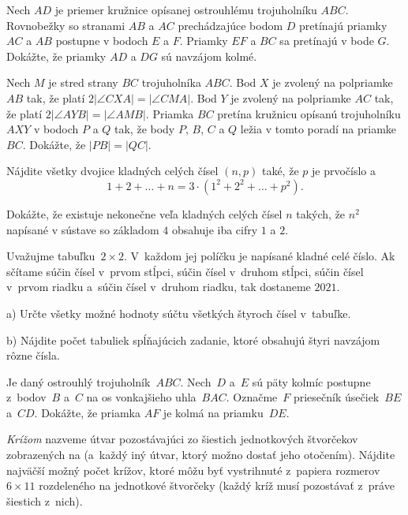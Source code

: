 {%
Nech $AD$ je priemer kružnice opísanej ostrouhlému trojuholníku $ABC$. Rovnobežky so stranami $AB$ a $AC$ prechádzajúce bodom $D$ pretínajú priamky $AC$ a $AB$ postupne v bodoch $E$ a $F$. Priamky $EF$ a $BC$ sa pretínajú v bode $G$. Dokážte, že priamky $AD$ a $DG$ sú navzájom kolmé.}

{%
Nech $M$ je stred strany $BC$ trojuholníka $ABC$. Bod $X$ je zvolený na polpriamke $AB$ tak, že platí $2|\angle CXA|=|\angle CMA|$. Bod $Y$ je zvolený na polpriamke $AC$ tak, že platí $2|\angle AYB|=|\angle AMB|$. Priamka $BC$ pretína kružnicu opísanú trojuholníku $AXY$ v bodoch $P$ a $Q$ tak, že body $P$, $B$, $C$ a $Q$ ležia v tomto poradí na priamke $BC$. Dokážte, že $|PB|=|QC|$.}

{%
Nájdite všetky dvojice kladných celých čísel $(n,p)$ také, že $p$ je prvočíslo a
$$
1+2+\dots + n  = 3\cdot (1^2 + 2^2 + \dots+ p^2).
$$}

{%
Dokážte, že existuje nekonečne veľa kladných celých čísel $n$ takých, že $n^2$ napísané v sústave so základom $4$ obsahuje iba cifry $1$ a $2$.}

{%
Uvažujme tabuľku~$2 \times 2$. V~každom jej políčku je napísané kladné celé číslo. Ak sčítame súčin čísel v~prvom stĺpci, súčin čísel v~druhom stĺpci, súčin čísel v~prvom riadku a~súčin čísel v~druhom riadku, tak dostaneme $2021$.
\item{a)} Určte všetky možné hodnoty súčtu všetkých štyroch čísel v~tabuľke.
\item{b)} Nájdite počet tabuliek spĺňajúcich zadanie, ktoré obsahujú štyri navzájom rôzne čísla.\endgraf
}

{%
Je daný ostrouhlý trojuholník~$ABC$. Nech~$D$ a~$E$ sú päty kolmíc postupne z~bodov~$B$ a~$C$ na os vonkajšieho uhla~$BAC$. Označme~$F$ priesečník úsečiek~$BE$ a~$CD$. Dokážte, že priamka $AF$ je kolmá na priamku~$DE$.}

{%
{\it Krížom\/} nazveme útvar pozostávajúci zo šiestich jednotkových štvorčekov zobrazených na \obr{} (a~každý iný útvar, ktorý možno dostať jeho otočením).
%
Nájdite najväčší možný počet krížov, ktoré môžu byť vystrihnuté z~papiera rozmerov~$6 \times 11$ rozdeleného na jednotkové štvorčeky (každý kríž musí pozostávať z~práve šiestich z~nich).}

